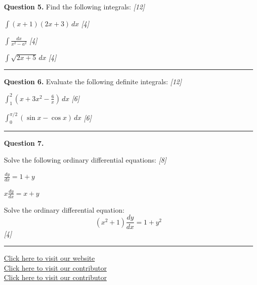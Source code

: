 \documentclass[11pt,a4paper]{article}
\newcommand{\pts}[1]{\hfill   \textit{[#1]}}
\begin{document}
\noindent   \textbf{Question 5.} Find the following integrals: \pts{12}

\begin{parts}
  \item $\int (x + 1)(2x + 3) \, dx$ \pts{4}
  \item $\int \frac{dx}{x^2 - a^2}$ \pts{4}
  \item $\int \sqrt{2x + 5} \, dx$ \pts{4}
\end{parts}

\medskip\rule{\linewidth}{0.2pt}

\medskip


\noindent   \textbf{Question 6.} Evaluate the following definite integrals: \pts{12}

\begin{parts}
  \item $\int_1^2 \left( x + 3x^2 - \frac{6}{x} \right) \, dx$ \pts{6}
  \item $\int_0^{\pi/2} (\sin x - \cos x) \, dx$ \pts{6}
\end{parts}

\medskip\rule{\linewidth}{0.2pt}

\medskip


\noindent   \textbf{Question 7.}

\begin{parts}
  \item Solve the following ordinary differential equations: \pts{8}
  
\begin{parts}
    \item $\frac{dy}{dx} = 1 + y$
    \item $x \frac{dy}{dx} = x + y$
  \end{parts}
  \item Solve the ordinary differential equation:
  \[ (x^2 + 1) \frac{dy}{dx} = 1 + y^2 \] \pts{4}
\end{parts}

\vfill
\rule{\linewidth}{0.4pt}

\begin{center}\small
\href{https://bhu-exam.vercel.app/}{Click here to visit our website}\\[4pt]
\href{https://me-aryan.vercel.app/}{Click here to visit our contributor}\\[4pt]
\href{https://quashan-me.vercel.app/}{Click here to visit our contributor}
\end{center}
\end{document}

